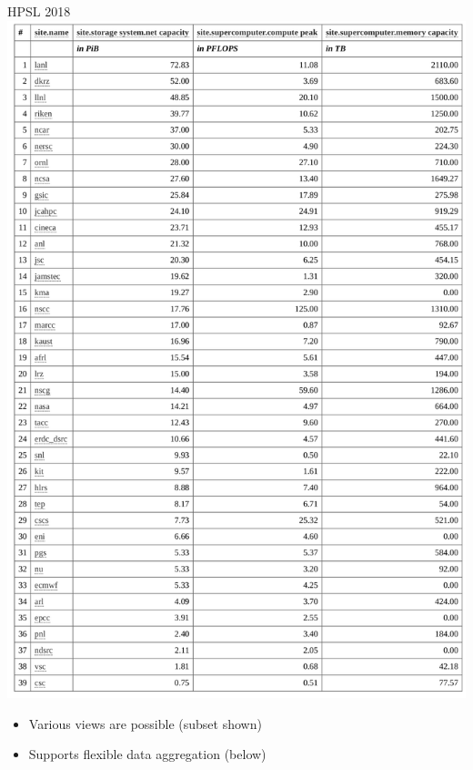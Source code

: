 \documentclass[portrait,a0paper,fontscale=0.4]{baposter}
\newcommand{\compresslist}{%
\setlength{\itemsep}{1pt}%
\setlength{\parskip}{0pt}%
\setlength{\parsep}{0pt}%
}
\begin{document}
\begin{poster}
\begin{posterbox}[name=engineering,column=3]{HPSL 2018}
\includegraphics[width=\textwidth]{hpsl-current}


\begin{itemize}\compresslist
\item Various views are possible (subset shown)
\item Supports flexible data aggregation (below)
\end{itemize}


\end{posterbox}
\end{poster}
\end{document}
